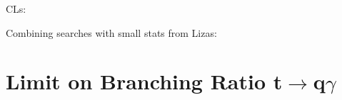 CLs:\cite{Read:2002hq}

Combining searches with small stats from Lizas: \cite{Junk:1999kv}

\section{Limit on Branching Ratio t$\rightarrow$q$\gamma$}



%
%
%
